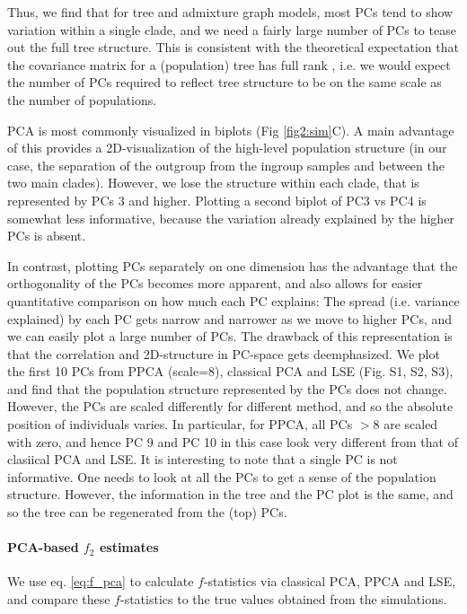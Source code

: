 \documentclass[12pt, letterpaper]{article}
\begin{document}
Thus, we find that for tree and admixture graph models, most PCs tend to show variation within a single clade, and we need a fairly large number of PCs to tease out the full tree structure. This is consistent with the theoretical expectation that the covariance matrix for a (population) tree has full rank \citep{felsenstein_maximum-likelihood_1973}, i.e. we would expect the number of PCs required to reflect tree structure to be on the same scale as the number of populations. 

PCA is most commonly visualized in biplots (Fig \ref{fig2:sim}C). A main advantage of this provides a 2D-visualization of the high-level population structure (in our case, the separation of the outgroup from the ingroup samples and between the two main clades). However, we lose the structure within each clade, that is represented by PCs 3 and higher. Plotting a second biplot of PC3 vs PC4 is somewhat less informative, because the variation already explained by the higher PCs is absent.

In contrast, plotting PCs separately on one dimension has the advantage that the orthogonality of the PCs becomes more apparent, and also allows for easier quantitative comparison on how much each PC explains: The spread (i.e. variance explained) by each PC gets narrow and narrower as we move to higher PCs, and we can easily plot a large number of PCs. The drawback of this representation is that the correlation and 2D-structure in PC-space gets deemphasized. We plot the first 10 PCs from PPCA (scale=8), classical PCA and LSE (Fig. S1, S2, S3), and find that the population structure represented by the PCs does not change. However, the PCs are scaled differently for different method, and so the absolute position of individuals varies. In particular, for PPCA, all PCs $>8$ are scaled with zero, and hence PC 9 and PC 10 in this case look very different from that of clasiical PCA and LSE.     
It is interesting to note that a single PC is not informative. One needs to look at all the PCs to get a sense of the population structure. However, the information in the tree and the PC plot is the same, and so the tree can be regenerated from the (top) PCs. 

\paragraph{PCA-based $f_2$ estimates}
We use eq. \ref{eq:f_pca} to calculate $f$-statistics via  classical PCA, PPCA and LSE, and compare these $f$-statistics to the true values obtained from  the simulations. 
\end{document}

